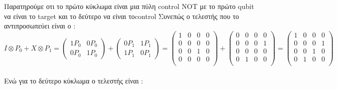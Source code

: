 \documentclass[12pt]{article}
\begin{document}
\section*{{}}

Παρατηρούμε οτι το πρώτο κύκλωμα είναι μια πύλη \textlatin{control NOT}  με το πρώτο \textlatin{qubit} να είναι το \textlatin{target} και το δεύτερο να είναι το\textlatin{control}
Συνεπώς ο τελεστής που το αντιπροσωπεύει είναι ο :
$$I\otimes P_0  + X\otimes P_1 = \begin{pmatrix*}
    1P_0 &0P_0\\
    0P_0 &1P_0
\end{pmatrix*} + \begin{pmatrix*}
    0P_1 &1P_1\\
    1P_1 &0P_1
\end{pmatrix*} = \begin{pmatrix*}
    1 &0 & 0& 0\\
    0 &0 & 0&0 \\
    0 &0 & 1& 0\\
    0 &0 & 0&0 \\
\end{pmatrix*} + \begin{pmatrix*}
    0 &0 & 0& 0\\
    0 &0 & 0&1 \\
    0 &0 & 0& 0\\
    0 &1 & 0&0 \\
\end{pmatrix*} = \begin{pmatrix*}
    1 &0 & 0& 0\\
    0 &0 & 0&1 \\
    0 &0 & 1& 0\\
    0 &1 & 0&0 \\
\end{pmatrix*}$$ \\ 
Ενώ για το δεύτερο κύκλωμα ο τελεστής είναι :
\end{document}
